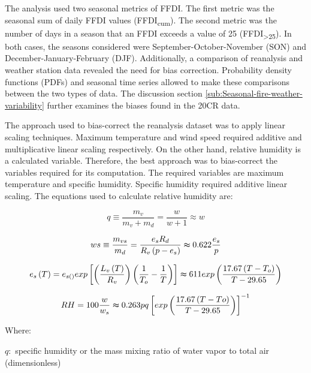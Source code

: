 The analysis used two seasonal metrics of FFDI. The first metric was
the seasonal sum of daily FFDI values (FFDI\textsubscript{cum}).
The second metric was the number of days in a season that an FFDI
exceeds a value of 25 (FFDI\textsubscript{>25}). In both cases, the
seasons considered were September-October-November (SON) and December-January-February
(DJF). Additionally, a comparison of reanalysis and weather station
data revealed the need for bias correction. Probability density functions
(PDFs) and seasonal time series allowed to make these comparisons
between the two types of data. The discussion section \ref{sub:Seasonal-fire-weather-variability}
further examines the biases found in the 20CR data. 

The approach used to bias-correct the reanalysis dataset was to apply
linear scaling techniques. Maximum temperature and wind speed required
additive and multiplicative linear scaling respectively. On the other
hand, relative humidity is a calculated variable. Therefore, the best
approach was to bias-correct the variables required for its computation.
The required variables are maximum temperature and specific humidity.
Specific humidity required additive linear scaling. The equations
used to calculate relative humidity are: 

\begin{equation}
q\equiv\frac{m_{v}}{m_{v}+m_{d}}=\frac{w}{w+1}\approx w
\end{equation}


\begin{equation}
ws\equiv\frac{m_{vs}}{m_{d}}=\frac{e_{s}R_{d}}{R_{v}\left(p-e_{s}\right)}\thickapprox0.622\frac{e_{s}}{p}
\end{equation}


\begin{equation}
e_{s}\left(T\right)=e_{s()}exp\left[\left(\frac{L_{v}\left(T\right)}{R_{v}}\right)\left(\frac{1}{T_{o}}-\frac{1}{T}\right)\right]\thickapprox611exp\left(\frac{17.67\left(T-T_{o}\right)}{T-29.65}\right)
\end{equation}


\begin{equation}
RH=100\frac{w}{w_{s}}\thickapprox0.263pq\left[exp\left(\frac{17.67\left(T-To\right)}{T-29.65}\right)\right]^{-1}
\end{equation}


Where:

$q:$ specific humidity or the mass mixing ratio of water vapor to
total air (dimensionless)

